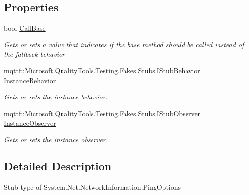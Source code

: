 \subsection*{Properties}
\begin{DoxyCompactItemize}
\item 
bool \hyperlink{class_system_1_1_net_1_1_network_information_1_1_fakes_1_1_stub_ping_options_a753ee95d038aa25d650a93c1e21f295d}{Call\-Base}
\begin{DoxyCompactList}\small\item\em Gets or sets a value that indicates if the base method should be called instead of the fallback behavior\end{DoxyCompactList}\item 
mqttf\-::\-Microsoft.\-Quality\-Tools.\-Testing.\-Fakes.\-Stubs.\-I\-Stub\-Behavior \hyperlink{class_system_1_1_net_1_1_network_information_1_1_fakes_1_1_stub_ping_options_add5438dbeac2044ff17915254201f881}{Instance\-Behavior}
\begin{DoxyCompactList}\small\item\em Gets or sets the instance behavior.\end{DoxyCompactList}\item 
mqttf\-::\-Microsoft.\-Quality\-Tools.\-Testing.\-Fakes.\-Stubs.\-I\-Stub\-Observer \hyperlink{class_system_1_1_net_1_1_network_information_1_1_fakes_1_1_stub_ping_options_a08f4da0c9c39b08afa3ce5a478caf7e5}{Instance\-Observer}
\begin{DoxyCompactList}\small\item\em Gets or sets the instance observer.\end{DoxyCompactList}\end{DoxyCompactItemize}


\subsection{Detailed Description}
Stub type of System.\-Net.\-Network\-Information.\-Ping\-Options



